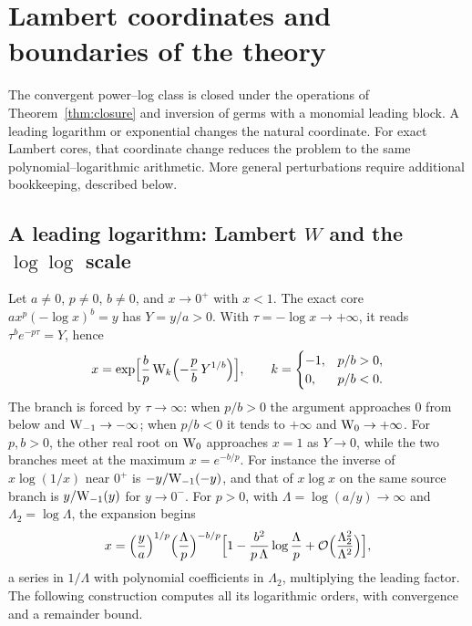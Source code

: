 \section{Lambert coordinates and boundaries of the theory}
\label{sec:boundaries}

The convergent power--log class is closed under the operations of Theorem~\ref{thm:closure} and inversion of germs with a monomial leading block. A leading logarithm or exponential changes the natural coordinate. For exact Lambert cores, that coordinate change reduces the problem to the same polynomial--logarithmic arithmetic. More general perturbations require additional bookkeeping, described below.

\subsection{A leading logarithm: Lambert \texorpdfstring{$W$}{W} and the \texorpdfstring{$\log\log$}{log-log} scale}

Let $a\ne0$, $p\ne0$, $b\ne0$, and $x\to0^+$ with $x<1$. The exact core $ax^p(-\log x)^b=y$ has $Y=y/a>0$. With $\tau=-\log x\to+\infty$, it reads $\tau^be^{-p\tau}=Y$, hence
\begin{equation}
 x=\exp\Bigl[\frac bp\,\mathrm W_k\Bigl(-\frac pb\,Y^{1/b}\Bigr)\Bigr],\qquad
 k=\begin{cases}-1,&p/b>0,\\0,&p/b<0.\end{cases}
 \label{eq:lambert-core}
\end{equation}
The branch is forced by $\tau\to\infty$: when $p/b>0$ the argument approaches $0$ from below and $\mathrm W_{-1}\to-\infty$; when $p/b<0$ it tends to $+\infty$ and $\mathrm W_0\to+\infty$. For $p,b>0$, the other real root on $\mathrm W_0$ approaches $x=1$ as $Y\to0$, while the two branches meet at the maximum $x=e^{-b/p}$. For instance the inverse of $x\log(1/x)$ near $0^+$ is $-y/\mathrm W_{-1}(-y)$, and that of $x\log x$ on the same source branch is $y/\mathrm W_{-1}(y)$ for $y\to0^-$. For $p>0$, with $\Lambda=\log(a/y)\to\infty$ and $\Lambda_2=\log\Lambda$, the expansion begins
\begin{equation}
 x=\Bigl(\frac ya\Bigr)^{1/p}\Bigl(\frac\Lambda p\Bigr)^{-b/p}\Bigl[1-\frac{b^2}{p\,\Lambda}\log\frac\Lambda p+\mathcal O\Bigl(\frac{\Lambda_2^2}{\Lambda^2}\Bigr)\Bigr],
 \label{eq:loglog}
\end{equation}
a series in $1/\Lambda$ with polynomial coefficients in $\Lambda_2$, multiplying the leading factor. The following construction computes all its logarithmic orders, with convergence and a remainder bound.

